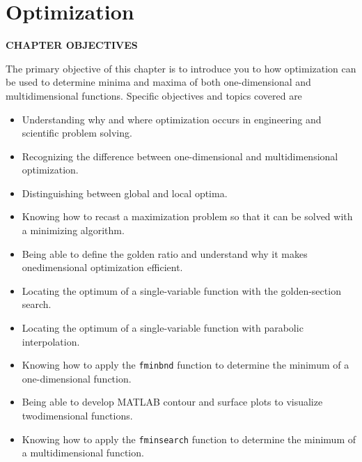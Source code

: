 \documentclass[../main.tex]{subfiles}
\begin{document}
\chapter{Optimization}
\label{cha:cha_7}
\begin{center}
\Large{\textbf{CHAPTER OBJECTIVES}}
\end{center}

The primary objective of this chapter is to introduce you to how optimization can be
used to determine minima and maxima of both one-dimensional and multidimensional
functions. Specific objectives and topics covered are
\begin{itemize}
\item Understanding why and where optimization occurs in engineering and scientific
problem solving.
\item Recognizing the difference between one-dimensional and multidimensional
optimization.
\item Distinguishing between global and local optima.
\item Knowing how to recast a maximization problem so that it can be solved with a
minimizing algorithm.
\item Being able to define the golden ratio and understand why it makes onedimensional
optimization efficient.
\item Locating the optimum of a single-variable function with the golden-section search.
\item Locating the optimum of a single-variable function with parabolic interpolation.
\item Knowing how to apply the \texttt{fminbnd} function to determine the minimum of a
one-dimensional function.
\item Being able to develop MATLAB contour and surface plots to visualize twodimensional
functions.
\item Knowing how to apply the \texttt{fminsearch} function to determine the minimum of a
multidimensional function.

\end{itemize}

\newpage

\Large\color{cyan}{YOU’VE GOT A PROBLEM}
\end{document}
